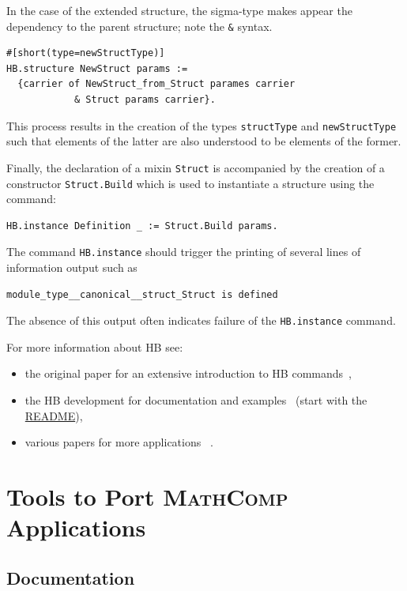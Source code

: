 \documentclass{article}
\def\mathcomp{\textsc{MathComp}}
\def\hb{\textsc{HB}}
\def\coqin#1{\texttt{#1}}
\def\rei#1{{\color{red}{TODO(rei): #1}}}
\begin{document}
In the case of the extended structure, the sigma-type makes appear the
dependency to the parent structure; note the \coqin{&} syntax.
\begin{verbatim}
#[short(type=newStructType)]
HB.structure NewStruct params :=
  {carrier of NewStruct_from_Struct parames carrier
            & Struct params carrier}.
\end{verbatim}

This process results in the creation of the types \coqin{structType}
and \coqin{newStructType} such that elements of the latter are also
understood to be elements of the former.

Finally, the declaration of a mixin \coqin{Struct} is accompanied by
the creation of a constructor \coqin{Struct.Build} which is used to instantiate
a structure using the command:
\begin{verbatim}
HB.instance Definition _ := Struct.Build params.
\end{verbatim}
The command \coqin{HB.instance} should trigger the printing of several
lines of information output such as
\begin{verbatim}
module_type__canonical__struct_Struct is defined
\end{verbatim}
The absence of this output often indicates failure of the
\coqin{HB.instance} command.

\bigskip

For more information about \hb{} see:
\begin{itemize}
\item the original paper for an extensive introduction to \hb{} commands~\cite{cohen2020fscd},
\item the \hb{} development for documentation and examples~\cite{hb}
(start with the \href{https://github.com/math-comp/hierarchy-builder#readme}{README}),
\item various papers for more applications~\cite{mathcomp2021coq} \cite[Sect.~3]{affeldt2022arxiv} \cite[Sect.~4]{affeldt2023cpp}.
  \rei{more pointers}
\end{itemize}

\section{Tools to Port \mathcomp{} Applications}
\label{sec:explore}

\subsection{Documentation}
\end{document}

